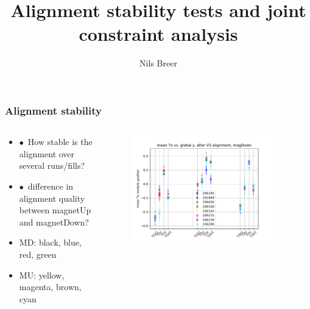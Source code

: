 \documentclass[aspectratio=1610, 12pt]{beamer}
\title{Alignment stability tests and joint constraint analysis}
\author[N.Breer]{Nils Breer}
\institute{Faculty Physics}
\begin{document}
\maketitle

\begin{frame}\frametitle{Alignment stability}
  \begin{columns}
    \begin{column}[c]{0.40\textwidth}
      \begin{itemize}
        \item $\bullet$\, How stable is the alignment over several runs/fills?
        \item $\bullet$\, difference in alignment quality between magnetUp and magnetDown?
        \item MD: black, blue, red, green
        \item MU: yellow, magenta, brown, cyan
      \end{itemize}
    \end{column}
    \begin{column}[c]{0.60\textwidth}
      \begin{figure}
        \includegraphics[width=0.9\textwidth]{plots/all_runs_global_z_vs_Tx.pdf}
      \end{figure}
    \end{column}
  \end{columns}
\end{frame}
\end{document}
